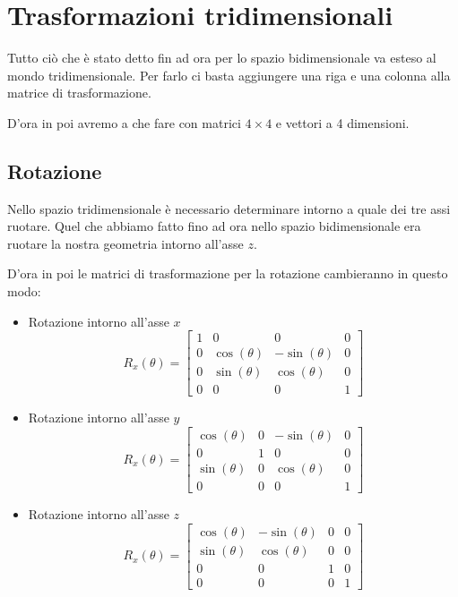 \chapter{Trasformazioni tridimensionali}
Tutto ci\`o che \`e stato detto fin ad ora per lo spazio bidimensionale va esteso al mondo
tridimensionale. Per farlo ci basta aggiungere una riga e una colonna alla matrice di
trasformazione.

D'ora in poi avremo a che fare con matrici $4 \times 4$ e vettori a 4 dimensioni.

\section{Rotazione}
Nello spazio tridimensionale \`e necessario determinare intorno a quale dei tre assi ruotare.
Quel che abbiamo fatto fino ad ora nello spazio bidimensionale era ruotare la nostra
geometria intorno all'asse $z$.

D'ora in poi le matrici di trasformazione per la rotazione cambieranno in questo modo:
\begin{itemize}
	\item Rotazione intorno all'asse $x$
	      \[
		      R_x(\theta) = \begin{bmatrix}
			      1 & 0            & 0             & 0 \\
			      0 & \cos(\theta) & -\sin(\theta) & 0 \\
			      0 & \sin(\theta) & \cos(\theta)  & 0 \\
			      0 & 0            & 0             & 1
		      \end{bmatrix}
	      \]
	\item Rotazione intorno all'asse $y$
	      \[
		      R_x(\theta) = \begin{bmatrix}
			      \cos(\theta) & 0 & -\sin(\theta) & 0 \\
			      0            & 1 & 0             & 0 \\
			      \sin(\theta) & 0 & \cos(\theta)  & 0 \\
			      0            & 0 & 0             & 1
		      \end{bmatrix}
	      \]
	\item Rotazione intorno all'asse $z$
	      \[
		      R_x(\theta) = \begin{bmatrix}
			      \cos(\theta) & -\sin(\theta) & 0 & 0 \\
			      \sin(\theta) & \cos(\theta)  & 0 & 0 \\
			      0            & 0             & 1 & 0 \\
			      0            & 0             & 0 & 1
		      \end{bmatrix}
	      \]
\end{itemize}

